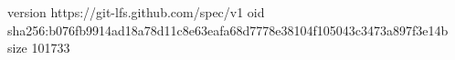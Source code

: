 version https://git-lfs.github.com/spec/v1
oid sha256:b076fb9914ad18a78d11c8e63eafa68d7778e38104f105043c3473a897f3e14b
size 101733
